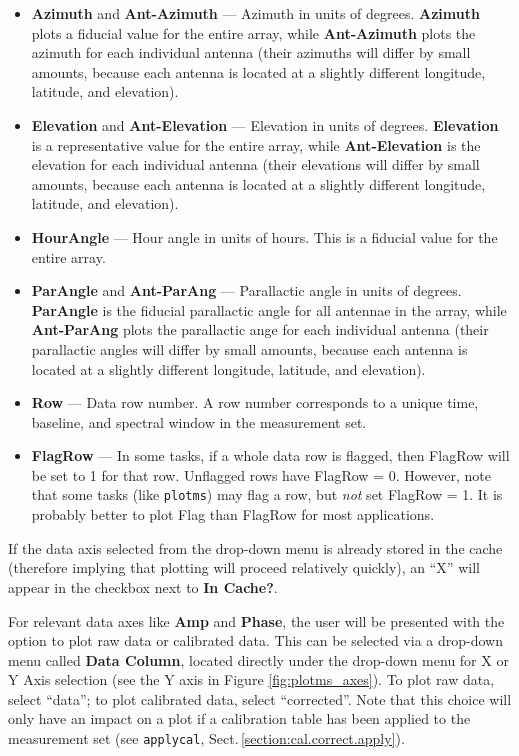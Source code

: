 \begin{itemize}
\item {\bf Azimuth} and {\bf Ant-Azimuth} --- Azimuth in units of degrees. {\bf Azimuth} plots a fiducial value for the entire array, while {\bf Ant-Azimuth} plots the azimuth for each individual antenna (their azimuths will differ by small amounts, because each antenna is located at a slightly different longitude, latitude, and elevation).

\item {\bf Elevation} and {\bf Ant-Elevation} --- Elevation in units
  of degrees. {\bf Elevation} is a representative value for the entire
  array, while {\bf Ant-Elevation} is the elevation for each
  individual antenna (their elevations will differ by small amounts,
  because each antenna is located at a slightly different longitude,
  latitude, and elevation).

\item {\bf HourAngle} --- Hour angle in units of hours. This is a fiducial value for the entire array.

\item {\bf ParAngle} and {\bf Ant-ParAng} --- Parallactic angle in
  units of degrees. {\bf ParAngle} is the fiducial parallactic angle
  for all antennae in the array, while {\bf Ant-ParAng} plots the
  parallactic ange for each individual antenna (their parallactic
  angles will differ by small amounts, because each antenna is located
  at a slightly different longitude, latitude, and elevation).

\item {\bf Row} --- Data row number. A row number corresponds to a
  unique time, baseline, and spectral window in the measurement set.

\item {\bf FlagRow} --- In some tasks, if a whole data row is flagged,
  then FlagRow will be set to 1 for that row. Unflagged rows have
  FlagRow = 0. However, note that some tasks (like {\tt plotms}) may
  flag a row, but {\it not} set FlagRow = 1. It is probably better to
  plot Flag than FlagRow for most applications.
\end{itemize}

If the data axis selected from the drop-down menu is already stored in
the cache (therefore implying that plotting will proceed relatively
quickly), an ``X'' will appear in the checkbox next to {\bf In
  Cache?}.

For relevant data axes like {\bf Amp} and {\bf Phase}, the user will
be presented with the option to plot raw data or calibrated data. This
can be selected via a drop-down menu called {\bf Data Column}, located
directly under the drop-down menu for X or Y Axis selection (see the Y
axis in Figure \ref{fig:plotms_axes}). To plot raw data, select
``data''; to plot calibrated data, select ``corrected''. Note that
this choice will only have an impact on a plot if a calibration table
has been applied to the measurement set (see {\tt applycal},
Sect.\,\ref{section:cal.correct.apply}).

